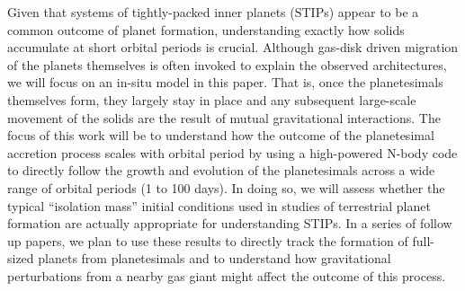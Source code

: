 \documentclass[twocolumn]{aastex63}
\begin{document}
Given that systems of tightly-packed inner planets (STIPs) appear to
be a common outcome of planet formation, understanding exactly how
solids accumulate at short orbital periods is crucial. Although
gas-disk driven migration of the planets themselves is often invoked
to explain the observed architectures, we will focus on an in-situ
model in this paper. That is, once the planetesimals themselves form,
they largely stay in place and any subsequent large-scale movement of
the solids are the result of mutual gravitational interactions. The
focus of this work will be to understand how the outcome of the
planetesimal accretion process scales with orbital period by using a
high-powered N-body code to directly follow the growth and evolution
of the planetesimals across a wide range of orbital periods (1 to 100
days). In doing so, we will assess whether the typical ``isolation
mass'' initial conditions used in studies of terrestrial planet formation are actually appropriate for understanding STIPs. In a series of follow up papers, we plan to use these results to directly track the formation of full-sized planets from planetesimals and to understand how gravitational perturbations from a nearby gas giant might affect the outcome of this process.


\end{document}
